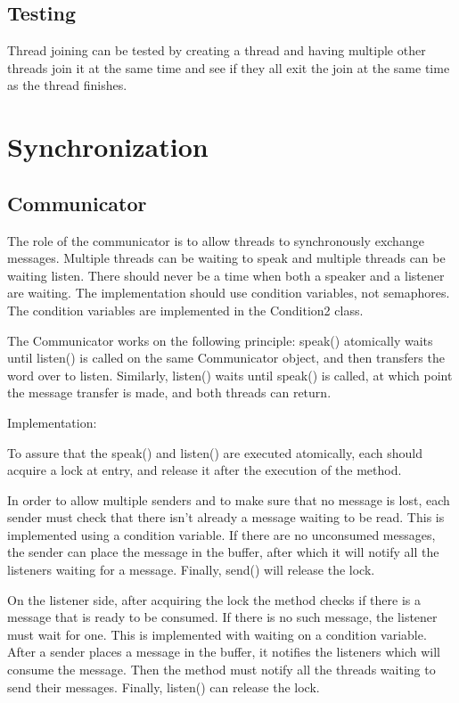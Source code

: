 \documentclass[a4paper,10pt]{article}
\begin{document}
\subsection{Testing}

Thread joining can be tested by creating a thread and having multiple other threads join it at the same time and see if they all exit
the join at the same time as the thread finishes.
 

\section{Synchronization}

\subsection{Communicator}
The role of the communicator is to allow threads to synchronously exchange messages. Multiple threads can be waiting to speak and multiple threads can be waiting listen. There should never be a time when both a speaker and a listener are waiting. The implementation should use condition variables, not semaphores. The condition variables are implemented in the Condition2 class.

The Communicator works on the following principle: speak() atomically waits until listen() is called on the same Communicator object, and then transfers the word over to listen. Similarly, listen() waits until speak() is called, at which point the message transfer is made, and both threads can return.

Implementation:

To assure that the speak() and listen() are executed atomically, each should acquire a lock at entry, and release it after the execution of the method. 

In order to allow multiple senders and to make sure that no message is lost, each sender must check that there isn't already a message waiting to be read. This is implemented using a condition variable. If there are no unconsumed messages, the sender can place the message in the buffer, after which it will notify all the listeners waiting for a message. Finally, send() will release the lock.

On the listener side, after acquiring the lock the method checks if there is a message that is ready to be consumed. If there is no such message, the listener must wait for one. This is implemented with waiting on a condition variable. After a sender places a message in the buffer, it notifies the listeners which will consume the message. Then the method must notify all the threads waiting to send their messages. Finally, listen() can release the lock.
\end{document}
